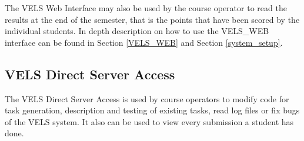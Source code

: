 The VELS Web Interface may also be used by the course operator to read the results at the end of the semester,
that is the points that have been scored by the individual students. In depth description on how to use the 
VELS\_WEB interface can be found in Section \ref{VELS_WEB} and Section \ref{system_setup}.


\subsection{VELS Direct Server Access}\label{directserveraccess}
The VELS Direct Server Access is used by course operators to  modify code for task
generation, description and testing of existing tasks, read log files or fix bugs of the VELS system. 
It also can be used to view every submission a student has done. 
